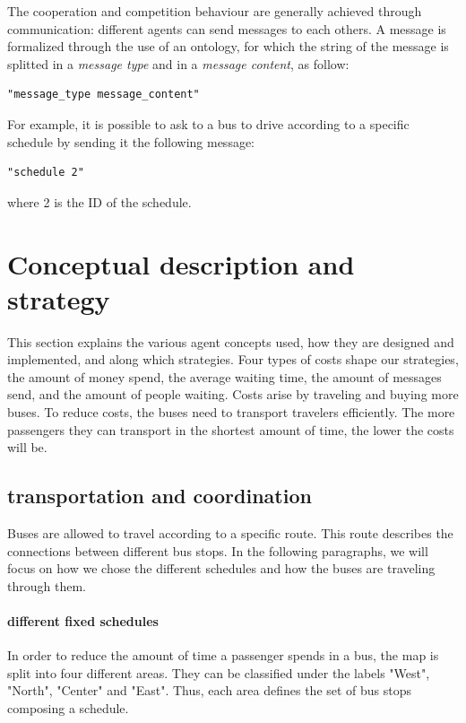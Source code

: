 \documentclass[a4paper]{article}
\begin{document}
The cooperation and competition behaviour are generally achieved through communication: different agents can send messages to each others. A message is formalized through the use of an ontology, for which the string of the message is splitted in a \textit{message type} and in a \textit{message content}, as follow:

\begin{verbatim}
"message_type message_content"
\end{verbatim}

For example, it is possible to ask to a bus to drive according to a specific schedule by sending it the following message:

\begin{verbatim}
"schedule 2"
\end{verbatim}

where 2 is the ID of the schedule.

\section{Conceptual description and strategy}
This section explains the various agent concepts used, how they are designed and implemented, and along which strategies. Four types of costs shape our strategies, the amount of money spend, the average waiting time, the amount of messages send, and the amount of people waiting. Costs arise by traveling and buying more buses. To reduce costs, the buses need to transport travelers efficiently. The more passengers they can transport in the shortest amount of time, the lower the costs will be.

\subsection{transportation and coordination}
Buses are allowed to travel according to a specific route. This route describes the connections between different bus stops. In the following paragraphs, we will focus on how we chose the different schedules and how the buses are traveling through them.
 
\paragraph{different fixed schedules}
In order to reduce the amount of time a passenger spends in a bus, the map is split into four different areas. They can be classified under the labels "West", "North", "Center" and "East". Thus, each area defines the set of bus stops composing a schedule.
\end{document}
